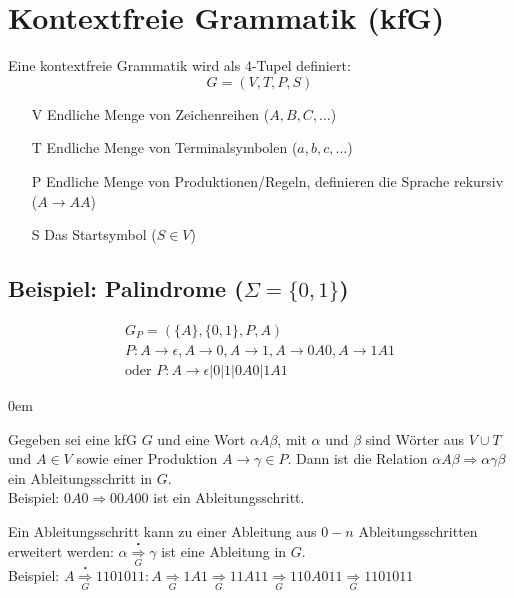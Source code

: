 \section{Kontextfreie Grammatik (kfG)}
Eine kontextfreie Grammatik wird als 4-Tupel definiert:
\begin{equation*}
	G = (V, T, P, S)
\end{equation*}
\begin{itemize}\itemsep0em
	\item [V] Endliche Menge von Zeichenreihen ($A, B, C, \dots$)
	\item [T] Endliche Menge von Terminalsymbolen ($a, b, c, \dots$)
	\item [P] Endliche Menge von Produktionen/Regeln, definieren die Sprache rekursiv ($A \rightarrow AA$)
	\item [S] Das Startsymbol ($S \in V$)
\end{itemize}

\subsection{Beispiel: Palindrome ($\Sigma = \{0, 1\}$)}
\begin{gather*}
	G_P = (\{A\}, \{0,1\}, P, A)\\
	P: A \rightarrow \epsilon, A \rightarrow 0, A \rightarrow 1, 
	A \rightarrow 0A0,  A \rightarrow 1A1\\
	\mbox{oder }P: A \rightarrow \epsilon|0|1|0A0|1A1
\end{gather*}

\begin{description}\itemsep0em
	\item [Ableitungsschritt] 
	Gegeben sei eine kfG $G$ und eine Wort $\alpha A\beta$, mit $\alpha$ und $\beta$ sind Wörter aus $V \cup T$ und $A \in V$ sowie einer Produktion $A \rightarrow \gamma \in P$. Dann ist die Relation $\alpha A\beta \Rightarrow \alpha\gamma\beta$ ein Ableitungsschritt in $G$.\\
	Beispiel: $0A0 \Rightarrow 00A00$ ist ein Ableitungsschritt.\\

	\item[Ableitung]
	Ein Ableitungsschritt kann zu einer Ableitung aus $0-n$ Ableitungsschritten erweitert werden: $\alpha \overset{\centerdot}{\underset{G}{\Rightarrow}} \gamma$ ist eine Ableitung in $G$.\\
	Beispiel: $A \overset{\centerdot}{\underset{G}{\Rightarrow}} 1101011: A \underset{G}{\Rightarrow} 1A1 \underset{G}{\Rightarrow} 11A11 \underset{G}{\Rightarrow} 110A011 \underset{G}{\Rightarrow} 1101011$
\end{description}

